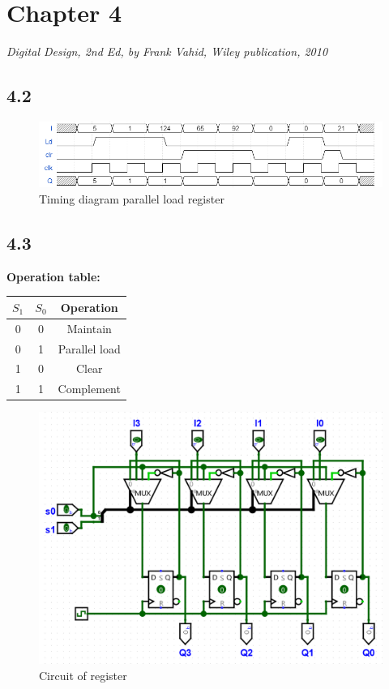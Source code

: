 \documentclass{article}
\begin{document}
\section*{Chapter 4}
\textit{Digital Design, 2nd Ed, by Frank Vahid, Wiley publication, 2010}

\subsection*{4.2}
\begin{figure}[H]
    \centering
    \includegraphics[width=\linewidth]{./images/4.2.png}
    \caption*{Timing diagram parallel load register}
\end{figure}

\subsection*{4.3}
\textbf{Operation table:} \newline
\begin{tabular}{c c | c}
    $S_1$ & $S_0$ & Operation \\
    \hline
    0 & 0 & Maintain \\
    0 & 1 & Parallel load \\
    1 & 0 & Clear \\
    1 & 1 & Complement \\
\end{tabular}

\begin{figure}[H]
    \centering
    \includegraphics[width=0.9\linewidth]{./images/4.3.png}
    \caption*{Circuit of register}
\end{figure}
\end{document}
